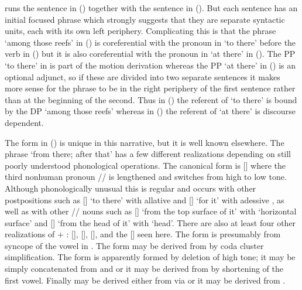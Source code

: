 \citeauthor{swanton:1909} runs the sentence in (\lastx) together with the sentence in (\nextx).
But each sentence has an initial focused phrase which strongly suggests that they are separate syntactic units, each with its own left periphery.
Complicating this is that the phrase  ‘among those reefs’ in (\lastx) is coreferential with the pronoun  in  ‘to there’ before the verb in (\lastx) but it is also coreferential with the pronoun  in  ‘at there’ in (\nextx).
The PP  ‘to there’ in is part of the motion derivation  whereas the PP  ‘at there’ in (\nextx) is an optional adjunct, so if these are divided into two separate sentences it makes more sense for the phrase  to be in the right periphery of the first sentence rather than at the beginning of the second.
Thus in (\lastx) the referent of  ‘to there’ is bound by the DP  ‘among those reefs’ whereas in (\nextx) the referent of  ‘at there’ is discourse dependent.

The form  in (\lastx) is unique in this narrative, but it is well known elsewhere.
The phrase  ‘from there; after that’ has a few different realizations depending on still poorly understood phonological operations.
The canonical form is  [] where the third nonhuman pronoun  // is lengthened and switches from high to low tone.
Although phonologically unusual this is regular and occurs with other postpositions such as  [] ‘to there’ with allative  and  [] ‘for it’ with adessive , as well as with other // nouns such as  [] ‘from the top surface of it’ with  ‘horizontal surface’ and  [] ‘from the head of it’ with  ‘head’.
There are also at least four other realizations of  + :  [],  [],  [], and the  [] seen here.
The form  is presumably from syncope of the  vowel in .
The  form may be derived from  by coda cluster simplification.
The form  is apparently formed by deletion of high tone; it may be simply concatenated from  and  or it may be derived from  by shortening of the first vowel.
Finally  may be derived either from  via  or it may be derived from .

